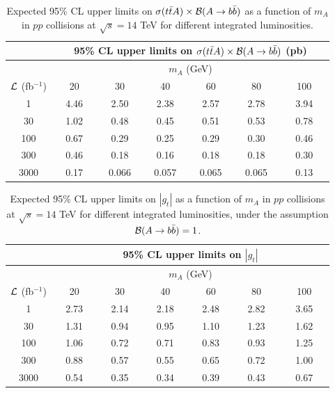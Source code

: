 \documentclass[preprintnumbers,superscriptaddress,nofootinbib,aps,prd,floatfix]{revtex4}
\newcommand{\ttbar}{\ensuremath{t\bar{t}}}
\begin{document}
\begin{table}[h] 
\begin{center} 
\begin{tabular}{ccccccc} 
\hline\hline
 & \multicolumn{6}{c}{95\% CL upper limits on $\sigma(\ttbar A) \times {\cal B}(A\to b\bar{b})$ (pb)} \\
\hline
  & \multicolumn{6}{c}{$m_A$ (GeV)} \\
  \cline{2-7} 
${\cal L}$ (fb$^{-1}$) & $\quad$ 20 $\quad$ & $\quad$ 30 $\quad$ & $\quad$ 40 $\quad$ & $\quad$ 60 $\quad$ & $\quad$ 80 $\quad$ & $\quad$ 100 $\quad$ \\
\hline
1 & 4.46 & 2.50 & 2.38 & 2.57 & 2.78 & 3.94 \\
30 & 1.02 & 0.48 & 0.45 & 0.51 & 0.53 & 0.78  \\
100 & 0.67 & 0.29 & 0.25 & 0.29 & 0.30 & 0.46 \\
300 & 0.46 & 0.18 & 0.16 & 0.18 & 0.18 & 0.30 \\
3000 & 0.17 & 0.066 & 0.057 & 0.065 & 0.065 & 0.13 \\
\hline\hline
\end{tabular} 
\caption{\small {Expected 95\% CL upper limits on $\sigma(\ttbar A) \times {\cal B}(A\to b\bar{b})$ as a function of $m_A$ 
in $pp$ collisions at $\sqrt{s}=14$ TeV for different integrated luminosities.}}
\label{tab:sigma_95CL} 
\end{center} 
\end{table} 

\begin{table}[h!] 
\begin{center} 
\begin{tabular}{ccccccc} 
\hline\hline
 & \multicolumn{6}{c}{95\% CL upper limits on $|g_t|$} \\
\hline
  & \multicolumn{6}{c}{$m_A$ (GeV)} \\
  \cline{2-7} 
${\cal L}$ (fb$^{-1}$) & $\quad$ 20 $\quad$ & $\quad$ 30 $\quad$ & $\quad$ 40 $\quad$ & $\quad$ 60 $\quad$ & $\quad$ 80 $\quad$ & $\quad$ 100 $\quad$ \\
\hline
1 & 2.73  & 2.14 & 2.18 & 2.48 & 2.82 & 3.65 \\
30 & 1.31  & 0.94 & 0.95 & 1.10 & 1.23 & 1.62 \\
100 & 1.06 & 0.72 & 0.71 & 0.83 & 0.93 & 1.25 \\
300 & 0.88 & 0.57 & 0.55 & 0.65 & 0.72 & 1.00 \\
3000 & 0.54 & 0.35 & 0.34 & 0.39 & 0.43 & 0.67 \\
\hline\hline
\end{tabular} 
\caption{\small {Expected 95\% CL upper limits on $|g_t|$ as a function of $m_A$ 
in $pp$ collisions at $\sqrt{s}=14$ TeV for different integrated luminosities, under the assumption ${\cal B}(A\to b\bar{b})=1$.}}
\label{tab:ct_95CL} 
\end{center} 
\end{table} 
\end{document}
